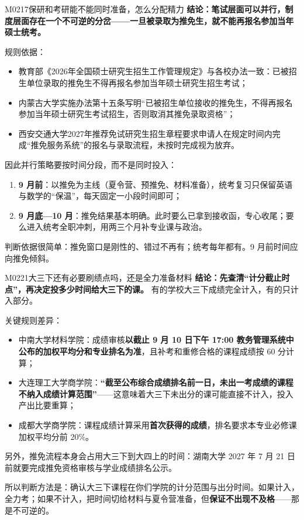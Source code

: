 \begin{qa}{M0217}{保研和考研能不能同时准备，怎么分配精力}
\textbf{结论：笔试层面可以并行，制度层面存在一个不可逆的分岔——一旦被录取为推免生，就不能再报名参加当年硕士统考。}

规则依据：
\begin{itemize}
  \item 教育部《2026年全国硕士研究生招生工作管理规定》与各校办法一致：已被招生单位录取的推免生不得再报名参加当年硕士研究生招生考试；
  \item 内蒙古大学实施办法第十五条写明“已被招生单位接收的推免生，不得再报名参加当年硕士研究生考试招生，否则取消其推免录取资格”；
  \item 西安交通大学2027年推荐免试研究生招生章程要求申请人在规定时间内完成“推免服务系统”的报名与录取流程，未按时完成视为放弃。
\end{itemize}

因此并行策略要按时间分段，而不是同时投入：
\begin{enumerate}
  \item \textbf{9 月前}：以推免为主线（夏令营、预推免、材料准备），统考复习只保留英语与数学的“保温”，每天固定一小段时间即可；
  \item \textbf{9 月底—10 月}：推免结果基本明确。此时要么已拿到接收函，专心收尾；要么进入统考全职冲刺，用两三个月补专业课与政治。
\end{enumerate}

判断依据很简单：推免窗口是刚性的、错过不再有；统考每年都有。9 月前时间应向推免倾斜。
\end{qa}

\begin{qa}{M0221}{大三下还有必要刷绩点吗，还是全力准备材料}
\textbf{结论：先查清“计分截止时点”，再决定投多少时间给大三下的课。} 有的学校大三下成绩完全计入，有的只计入部分。

关键规则差异：
\begin{itemize}
  \item 中南大学材料学院：成绩审核\textbf{以截止 9 月 10 日下午 17:00 教务管理系统中公布的加权平均分和专业排名为准}，且补考和重修合格的课程成绩按 60 分计算；
  \item 大连理工大学商学院：\textbf{“截至公布综合成绩排名前一日，未出一考成绩的课程不纳入成绩计算范围”}——这意味着大三下未出分的课可能直接不计入，投入产出比要重算；
  \item 成都大学商学院：课程成绩计算采用\textbf{首次获得的成绩}，排名要求本专业必修课加权平均分前 20\%。
\end{itemize}

另外，推免流程本身会占用大三下到大四上的时间：湖南大学 2027 年 7 月 21 日前就要完成推免资格审核与学业成绩排名公示。

所以判断方法是：确认大三下课程在你们学院的计分范围与出分时间。如果计入，全力考；如果不计入，把时间切给材料与夏令营准备，但\textbf{保证不出现不及格}——那是不可逆的。
\end{qa}

